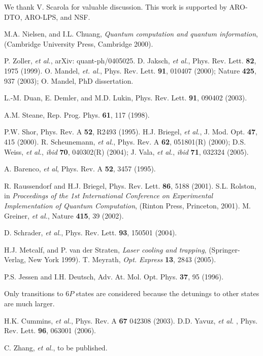 \documentclass[pra,aps,showpacs,twocolumn]{revtex4}
\begin{document}
\begin{acknowledgments}
We thank V. Scarola for valuable discussion. This work is supported by
ARO-DTO, ARO-LPS, and NSF.
\end{acknowledgments}

\begin{references}
 M.A. Nielsen, and I.L. Chuang, \textit{Quantum computation and quantum information}, (Cambridge University Press, Cambridge 2000).

 P. Zoller, {\it et al.}, arXiv: quant-ph/0405025.
 D. Jaksch, {\it et al.}, Phys. Rev. Lett. {\bf 82}, 1975 (1999).
 O. Mandel, {\it et. al.}, Phys. Rev. Lett. {\bf 91}, 010407 (2000); Nature {\bf 425},  937 (2003); O. Mandel, PhD dissertation.

 L.-M. Duan, E. Demler, and M.D. Lukin, Phys. Rev. Lett. {\bf 91}, 090402 (2003).

 A.M. Steane, Rep. Prog. Phys. {\bf 61}, 117 (1998).

 P.W. Shor, Phys. Rev. A {\bf 52}, R2493 (1995).
 H.J. Briegel, {\it et al.}, J. Mod. Opt. {\bf 47}, 415 (2000).
 R. Scheunemann, {\it et al.}, Phys. Rev. A {\bf 62}, 051801(R) (2000); 
D.S. Weiss, {\it et al.}, {\it ibid} {\bf 70}, 040302(R) (2004);
J. Vala, {\it et al.}, {\it ibid} {\bf 71}, 032324 (2005).

 A. Barenco, {\it et al}, Phys. Rev. A {\bf 52}, 3457 (1995).

 R. Raussendorf and H.J. Briegel, Phys. Rev. Lett. {\bf 86}, 5188 (2001).
 S.L. Rolston, in \textit{Proceedings of the 1st International Conference 
on Experimental Implementation of Quantum Computation}, (Rinton Press, Princeton, 2001).
 M. Greiner, {\it et al.}, Nature {\bf 415}, 39 (2002).

 D. Schrader,  {\it et al.}, Phys. Rev. Lett. {\bf 93}, 150501 (2004).

 H.J. Metcalf, and P. van der Straten, \textit{Laser cooling and trapping}, (Springer-Verlag, New York 1999).
  T. Meyrath, \textit{Opt. Express} {\bf13}, 2843 (2005).

  P.S. Jessen and I.H. Deutsch,  Adv. At. Mol. Opt. Phys. {\bf 37}, 95 (1996). 

 Only transitions to $6P$ states are considered because the detunings to
other states are much larger.

 H.K. Cummins,  \textit{et al.}, Phys. Rev. A {\bf 67} 042308 (2003).
 D.D. Yavuz, {\it et al. }, Phys. Rev. Lett. {\bf 96}, 063001 (2006).

 C. Zhang, {\it et al.}, to be published.
\end{references}
\end{document}
